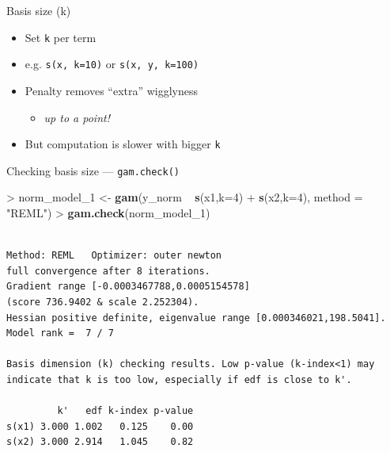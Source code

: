 \documentclass[10pt,ignorenonframetext,compress, aspectratio=169]{beamer}
\newenvironment{Shaded}{\begin{snugshade}}{\end{snugshade}}
\newcommand{\KeywordTok}[1]{\textcolor[rgb]{0.13,0.29,0.53}{\textbf{{#1}}}}
\newcommand{\DataTypeTok}[1]{\textcolor[rgb]{0.13,0.29,0.53}{{#1}}}
\newcommand{\DecValTok}[1]{\textcolor[rgb]{0.00,0.00,0.81}{{#1}}}
\newcommand{\StringTok}[1]{\textcolor[rgb]{0.31,0.60,0.02}{{#1}}}
\newcommand{\NormalTok}[1]{{#1}}
\providecommand{\tightlist}{%
  \setlength{\itemsep}{0pt}\setlength{\parskip}{0pt}}
\begin{document}
\begin{frame}[fragile]{Basis size (k)}

\begin{itemize}
\tightlist
\item
  Set \texttt{k} per term
\item
  e.g. \texttt{s(x,\ k=10)} or \texttt{s(x,\ y,\ k=100)}
\item
  Penalty removes ``extra'' wigglyness

  \begin{itemize}
  \tightlist
  \item
    \emph{up to a point!}
  \end{itemize}
\item
  But computation is slower with bigger \texttt{k}
\end{itemize}

\end{frame}

\begin{frame}[fragile]{Checking basis size --- \texttt{gam.check()}}

\begin{Shaded}
\begin{Highlighting}[]
\NormalTok{>}\StringTok{ }\NormalTok{norm_model_1 <-}\StringTok{ }\KeywordTok{gam}\NormalTok{(y_norm ~}\StringTok{ }\KeywordTok{s}\NormalTok{(x1,}\DataTypeTok{k=}\DecValTok{4}\NormalTok{) +}\StringTok{ }\KeywordTok{s}\NormalTok{(x2,}\DataTypeTok{k=}\DecValTok{4}\NormalTok{), }\DataTypeTok{method =} \StringTok{"REML"}\NormalTok{)}
\NormalTok{>}\StringTok{ }\KeywordTok{gam.check}\NormalTok{(norm_model_1)}
\end{Highlighting}
\end{Shaded}

\begin{verbatim}

Method: REML   Optimizer: outer newton
full convergence after 8 iterations.
Gradient range [-0.0003467788,0.0005154578]
(score 736.9402 & scale 2.252304).
Hessian positive definite, eigenvalue range [0.000346021,198.5041].
Model rank =  7 / 7 

Basis dimension (k) checking results. Low p-value (k-index<1) may
indicate that k is too low, especially if edf is close to k'.

         k'   edf k-index p-value
s(x1) 3.000 1.002   0.125    0.00
s(x2) 3.000 2.914   1.045    0.82
\end{verbatim}

\end{frame}
\end{document}

